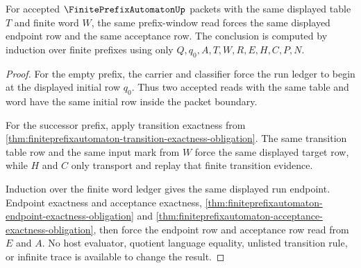 \begin{theorem}
\label{thm:finite-prefix-automaton-deterministic-readback}
For accepted $\FinitePrefixAutomatonUp$ packets with the same displayed table $T$ and finite word $W$, the same prefix-window read forces the same displayed endpoint row and the same acceptance row. The conclusion is computed by induction over finite prefixes using only $Q,q_0,A,T,W,R,E,H,C,P,N$.
\end{theorem}
\begin{proof}
For the empty prefix, the carrier and classifier force the run ledger to begin at the displayed initial row $q_0$. Thus two accepted reads with the same table and word have the same initial row inside the packet boundary.

For the successor prefix, apply transition exactness from \autoref{thm:finiteprefixautomaton-transition-exactness-obligation}. The same transition table row and the same input mark from $W$ force the same displayed target row, while $H$ and $C$ only transport and replay that finite transition evidence.

Induction over the finite word ledger gives the same displayed run endpoint. Endpoint exactness and acceptance exactness, \autoref{thm:finiteprefixautomaton-endpoint-exactness-obligation} and \autoref{thm:finiteprefixautomaton-acceptance-exactness-obligation}, then force the endpoint row and acceptance row read from $E$ and $A$. No host evaluator, quotient language equality, unlisted transition rule, or infinite trace is available to change the result.
\end{proof}

